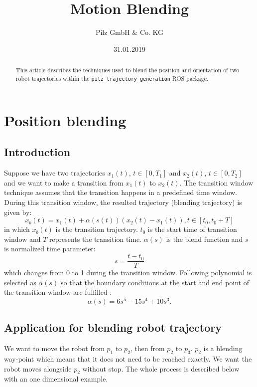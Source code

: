 \documentclass{article}
\begin{document}
\title{Motion Blending}
\author{Pilz GmbH \& Co. KG}
\date{31.01.2019}

\maketitle

\begin{abstract}
\noindent This article describes the techniques used to blend the position and orientation of two robot trajectories within the {\tt pilz\_trajectory\_generation}\cite{pilztrajectorygeneration} ROS package.
\end{abstract}


\newpage

\section{Position blending}

\subsection{Introduction}

Suppose we have two trajectories $x_1(t)$, $t\in[0,T_1]$ and $x_2(t)$, $t\in[0,T_2]$ and we want to make a transition from $x_1(t)$ to $x_2(t)$. The transition window technique assumes that the transition happens in a predefined time window. During this transition window, the resulted trajectory (blending trajectory) is given by:
\begin{equation}
	x_b(t) = x_1(t) + \alpha(s(t))(x_2(t)-x_1(t)), t \in [t_0, t_0 + T]
\end{equation}
in which $x_b(t)$ is the transition trajectory. $t_0$ is the start time of transition window and $T$ represents the transition time. $\alpha(s)$ is the blend function and $s$ is normalized time parameter:
\begin{equation}
s = \frac{t - t_0}{T}
\label{eq:1}
\end{equation}
which changes from 0 to 1 during the transition window. Following polynomial is selected as $\alpha(s)$ so that the boundary conditions at the start and end point of the transition window are fulfilled \cite{lloyd1993trajectory}:
\begin{equation}
\alpha(s) = 6s^5 - 15s^4 + 10s^3.
\label{eq:2}
\end{equation}

\subsection{Application for blending robot trajectory}
We want to move the robot from $p_1$ to $p_2$, then from $p_2$ to $p_3$. $p_2$ is a blending way-point which means that it does not need to be reached exactly. We want the robot moves alongside $p_2$ without stop. The whole process is described below with an one dimensional example.
\end{document}
